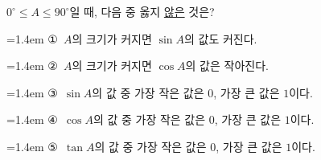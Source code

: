 $0^\circ\le A\le 90^\circ$일 때, 다음 중 옳지 \underline{않은} 것은?
\par\medskip\par\noindent\hangindent=1.4em {\small ①}\ $A$의 크기가 커지면 $\sin A$의 값도 커진다.\par\noindent\hangindent=1.4em {\small ②}\ $A$의 크기가 커지면 $\cos A$의 값은 작아진다.\par\noindent\hangindent=1.4em {\small ③}\ $\sin A$의 값 중 가장 작은 값은 $0$, 가장 큰 값은 $1$이다.\par\noindent\hangindent=1.4em {\small ④}\ $\cos A$의 값 중 가장 작은 값은 $0$, 가장 큰 값은 $1$이다.\par\noindent\hangindent=1.4em {\small ⑤}\ $\tan A$의 값 중 가장 작은 값은 $0$, 가장 큰 값은 $1$이다. \par\medskip
